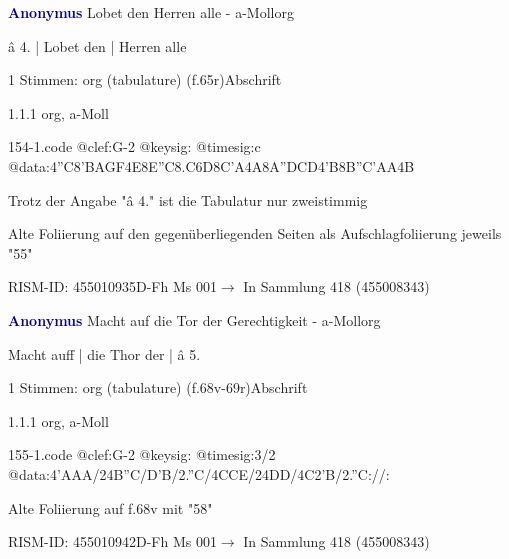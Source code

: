 \documentclass[twocolumn]{book}
\begin{document}
\par \vspace{7pt} \textcolor{darkblue}{\textbf{Anonymus  }}\hfillplus{\textbf{[154]}}\newline Lobet den Herren alle - a-Moll\newline org
\par \begin{itshape}[f.65r, at left:] â 4. | Lobet den | Herren alle\end{itshape} 
\par \textcolor{darkblue}{}  1 Stimmen: org (tabulature)  (f.65r)\newline Abschrift
\par 1.1.1  org, a-Moll  
\begin{filecontents*}{154-1.code}
@clef:G-2
@keysig:
@timesig:c
@data:4''C{8'BA}{GF}4E{8E''C8.C6D}{8C'A}4A{8A''DCD}4'B{8B''C}{'AA}4B
\end{filecontents*}
\newline
%
\par Trotz der Angabe "â 4." ist die Tabulatur nur zweistimmig
\par Alte Foliierung auf den gegenüberliegenden Seiten als Aufschlagfoliierung jeweils "55"
\par RISM-ID: 455010935\newline D-Fh  Ms 001\newline $\rightarrow$ In Sammlung 418 (455008343)
      
\par \vspace{7pt} \textcolor{darkblue}{\textbf{Anonymus  }}\hfillplus{\textbf{[155]}}\newline Macht auf die Tor der Gerechtigkeit - a-Moll\newline org
\par \begin{itshape}[f.68v, at left:] Macht auff | die Thor der | â 5.\end{itshape} 
\par \textcolor{darkblue}{}  1 Stimmen: org (tabulature)  (f.68v-69r)\newline Abschrift
\par 1.1.1  org, a-Moll  
\begin{filecontents*}{155-1.code}
@clef:G-2
@keysig:
@timesig:3/2
@data:4'AAA/24B''C/D'B/2.''C/4CCE/24DD/4C2'B/2.''C://:
\end{filecontents*}
\newline
%
\par Alte Foliierung auf f.68v mit "58"
\par RISM-ID: 455010942\newline D-Fh  Ms 001\newline $\rightarrow$ In Sammlung 418 (455008343)
      
\end{document}

